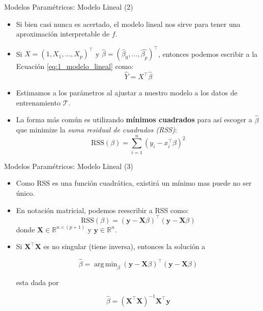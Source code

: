 \documentclass[usenames,dvipsnames]{beamer} %
\DeclareMathOperator*{\argmin}{arg\,min}
\newcommand\defi[1]{\textcolor{NavyBlue}{\textit{#1}}}
\newcommand{\matr}[1]{\mathbf{#1}}
\begin{document}
\begin{frame}{Modelos Param\'etricos: Modelo Lineal (2)}
    \begin{itemize}
        \item Si bien casi nunca es acertado, el modelo lineal nos sirve para tener una aproximaci\'on interpretable de $f$.
        \item Si $X=(1, X_1, \dots, X_p)^\intercal$ y $\hat{\beta} = (\hat{\beta}_0, \dots, \hat{\beta_p})^\intercal$, entonces podemos escribir a la Ecuaci\'on \ref{eq:1_modelo_lineal} como:
        \begin{equation}
            \hat{Y} = X^\intercal \hat{\beta}
        \end{equation} 
        \item Estimamos a los par\'ametros al ajustar a nuestro modelo a los datos de entrenamiento $\mathcal{T}$.
        \item La forma m\'as com\'un es utilizando \textbf{m\'inimos cuadrados} para as\'i escoger a $\hat{\beta}$ que minimize la \defi{suma residual de cuadrados (RSS)}:
        \[ \text{RSS}(\beta) = \sum_{i=1}^{n} \left( y_i - x_{i}^{\intercal} \beta \right)^2 \]
    \end{itemize}
\end{frame}

\begin{frame}{Modelos Param\'etricos: Modelo Lineal (3)}
    \begin{itemize}
        \item Como RSS es una funci\'on cuadr\'atica, existir\'a un m\'inimo mas puede no ser \'unico.
        \item En notaci\'on matricial, podemos reescribir a RSS como:
        \begin{equation}\label{eq:1_rss}
        \text{RSS}(\beta) = (\matr{y} - \matr{X}\beta)^\intercal (\matr{y} - \matr{X}\beta)  \end{equation}
        donde $\matr{X}\in\mathbb{R}^{n\times (p+1)}$ y $\matr{y}\in \mathbb{R}^n$. 
        \item Si $\matr{X}^\intercal \matr{X}$ es no singular (tiene inversa), entonces la soluci\'on a 
        
        \[\hat{\beta} = \argmin_{\beta} (\matr{y} - \matr{X}\beta)^\intercal (\matr{y} - \matr{X}\beta)  \]
        
        esta dada por
        
        \begin{equation}\label{eq:1_normaleq} \hat{\beta} = (\matr{X}^\intercal \matr{X})^{-1} \matr{X}^\intercal \matr{y} \end{equation}
    \end{itemize}
\end{frame}
\end{document}
